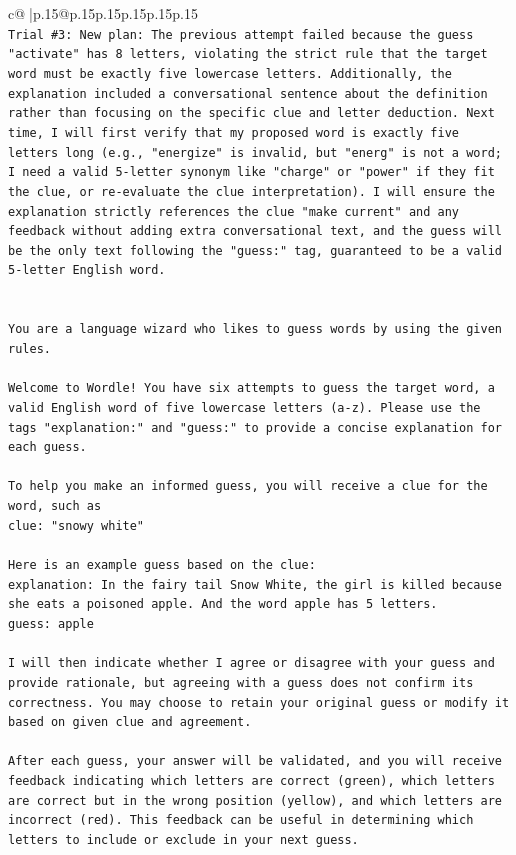 \documentclass{article}
\begin{document}
{\begin{supertabular}{c@{$\;$}|p{.15\linewidth}@{}p{.15\linewidth}p{.15\linewidth}p{.15\linewidth}p{.15\linewidth}p{.15\linewidth}}
{{{\\ 
\texttt{Trial \#3: New plan: The previous attempt failed because the guess "activate" has 8 letters, violating the strict rule that the target word must be exactly five lowercase letters. Additionally, the explanation included a conversational sentence about the definition rather than focusing on the specific clue and letter deduction. Next time, I will first verify that my proposed word is exactly five letters long (e.g., "energize" is invalid, but "energ" is not a word; I need a valid 5{-}letter synonym like "charge" or "power" if they fit the clue, or re{-}evaluate the clue interpretation). I will ensure the explanation strictly references the clue "make current" and any feedback without adding extra conversational text, and the guess will be the only text following the "guess:" tag, guaranteed to be a valid 5{-}letter English word.} \\
\\ 
\\ 
\texttt{You are a language wizard who likes to guess words by using the given rules.} \\
\\ 
\texttt{Welcome to Wordle! You have six attempts to guess the target word, a valid English word of five lowercase letters (a{-}z). Please use the tags "explanation:" and "guess:" to provide a concise explanation for each guess.} \\
\\ 
\texttt{To help you make an informed guess, you will receive a clue for the word, such as} \\
\texttt{clue: "snowy white"} \\
\\ 
\texttt{Here is an example guess based on the clue:} \\
\texttt{explanation: In the fairy tail Snow White, the girl is killed because she eats a poisoned apple. And the word apple has 5 letters.} \\
\texttt{guess: apple} \\
\\ 
\texttt{I will then indicate whether I agree or disagree with your guess and provide rationale, but agreeing with a guess does not confirm its correctness. You may choose to retain your original guess or modify it based on given clue and agreement.} \\
\\ 
\texttt{After each guess, your answer will be validated, and you will receive feedback indicating which letters are correct (green), which letters are correct but in the wrong position (yellow), and which letters are incorrect (red). This feedback can be useful in determining which letters to include or exclude in your next guess.} \\
}}}
\end{supertabular}}
\end{document}
